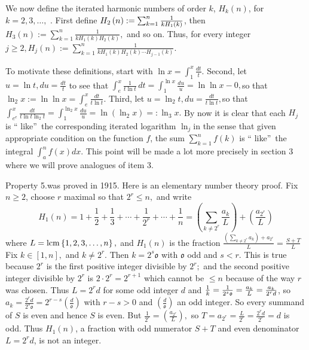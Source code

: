 \documentclass{article}
\begin{document}
We now define the iterated harmonic numbers of order $k$, $H_{k}(n)$, for $%
k=2,3,\dots ,$ . First define $H_{2}\left( n\right) :=\sum_{k=1}^{n}\frac{1}{%
kH_{1}\left( k\right) }$, then $H_{3}\left( n\right) :=\sum_{k=1}^{n}\frac{1%
}{kH_{1}\left( k\right) H_{2}\left( k\right) },$ and so on. Thus, for every
integer $j\geq 2,H_{j}\left( n\right) :=\sum_{k=1}^{n}\frac{1}{kH_{1}\left(
k\right) H_{2}\left( k\right) \cdots H_{j-1}\left( k\right) }$.

To motivate these definitions, start with $\ln x=\int_{1}^{x}\frac{dt}{t}.$%
Second, let $u=\ln t,du=\frac{dt}{t}$ to see that $\allowbreak \int_{e}^{x}%
\frac{1}{t\ln t}\,dt=\int_{1}^{\ln x}\frac{du}{u}=\ln \ln x-0,$so that $\ln
_{2}x:=\ln \ln x=\int_{e}^{x}\frac{dt}{t\ln t}$. Third, let $u=\ln _{2}t,du=%
\frac{dt}{t\ln t},$so that $\int_{e^{e}}^{x}\frac{dt}{t\ln t\ln _{2}t}%
=\int_{1}^{\ln _{2}x}\frac{du}{u}=\ln \left( \ln _{2}x\right) =:\ln _{3}x.$
By now it is clear that each $H_{j}$ is \textquotedblleft
like\textquotedblright\ the corresponding iterated logarithm $\ln _{j}$in
the sense that given appropriate condition on the function $f$, the sum $%
\sum_{k=1}^{n}f\left( k\right) $ is \textquotedblleft
like\textquotedblright\ the integral $\int_{a}^{n}f\left( x\right) dx.$ This
point will be made a lot more precisely in section 3 where we will prove
analogues of item 3.

Property 5.was proved in 1915. Here is an elementary number theory proof.
Fix $n\geq 2$, choose $r$ maximal so that $2^{r}\leq n,$ and write 
\[
H_{1}\left( n\right) =1+\frac{1}{2}+\frac{1}{3}+\cdots +\frac{1}{2^{r}}%
+\cdots +\frac{1}{n}=\left( \sum_{k\neq 2^{r}}\frac{a_{k}}{L}\right) +\left( 
\frac{a_{2^{r}}}{L}\right) 
\]%
where $L=\mathop{\rm lcm}\left\{ 1,2,3,\dots ,n\right\} ,$ and $H_{1}\left(
n\right) $ is the fraction $\frac{\left( \sum_{k\neq 2^{r}}a_{k}\right)
+a_{2^{r}}}{L}=\frac{S+T}{L}$ Fix $k\in \left[ 1,n\right] ,$ and $k\neq 2^{r}
$. Then $k=2^{s}\mathfrak{o}$ with $\mathfrak{o}$ odd and $s<r.$ This is
true because $2^{r}$ is the first positive integer divisible by $2^{r};$ and
the second positive integer divisible by $2^{r}$ is $2\cdot 2^{r}=2^{r+1}$
which cannot be $\leq n$ because of the way $r$ was chosen. Thus $L=2^{r}d$
for some odd integer $d$ and $\frac{1}{k}=\frac{1}{2^{s}\mathfrak{o}}=\frac{%
a_{k}}{L}=\frac{a_{k}}{2^{r}d}$, so $a_{k}=\frac{2^{r}d}{2^{s}\mathfrak{o}}%
=2^{r-s}\left( \frac{d}{\mathfrak{o}}\right) $ with $r-s>0$ and $\left( 
\frac{d}{\mathfrak{o}}\right) $ an odd integer. So every summand of $S$ is
even and hence $S$ is even. But $\frac{1}{2^{r}}=\left( \frac{a_{2^{r}}}{L}%
\right) ,$ so $T=a_{2^{r}}=\frac{L}{2^{r}}=\frac{2^{r}d}{2^{r}}=d$ is odd.
Thus $H_{1}\left( n\right) $, a fraction with odd numerator $S+T$ and even
denominator $L=2^{r}d$, is not an integer.
\end{document}
